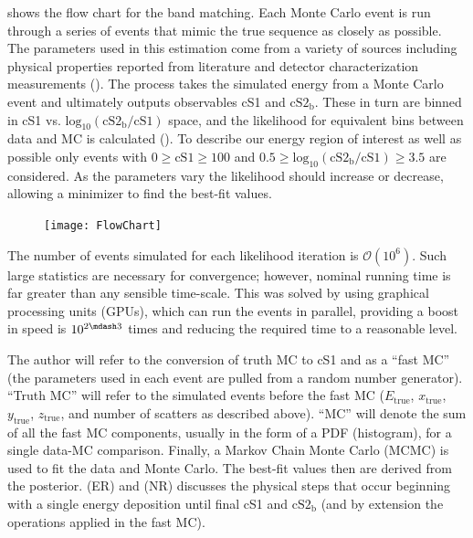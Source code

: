  shows the flow chart for the band matching.  Each Monte Carlo event is run
through a series of events that mimic the true sequence as closely as possible.  The parameters used in this estimation come from
a variety of sources including physical properties reported from literature and detector characterization measurements
().  The process takes the simulated energy from a Monte Carlo event and ultimately outputs observables cS1 and
$\mathrm{cS2_b}$.  These in turn are binned in cS1 vs. $\mathrm{log_{10}(cS2_b / cS1)}$ space, and the likelihood for equivalent bins
between data and MC is calculated ().  To describe our energy region of
interest as well as possible only events with $0 \geq \mathrm{cS1} \geq 100$ and $0.5 \geq \mathrm{log_{10}(cS2_b / cS1)} \geq 3.5$ are
considered.  As the parameters vary the likelihood should increase or decrease, allowing a minimizer to find the best-fit values.

\begin{figure}
\centering
\texttt{[image: FlowChart]}
\label{fig:er_nr_calibrations_parameter_determ_flow_chart}
\end{figure}

The number of events simulated for each likelihood iteration is $\mathcal{O}(10^6)$.  Such large statistics are necessary for convergence;
however, nominal running time is far greater than any sensible time-scale.  This was solved by using graphical processing units (GPUs),
which can run the events in parallel, providing a boost in speed is $10^{2 \mdash 3}$ times and reducing the required time to a
reasonable level.

The author will refer to the conversion of truth MC to cS1 and \cstwob as a ``fast MC'' (the parameters used in each event are pulled
from a random number generator).  ``Truth MC'' will refer to the simulated events before the fast MC ($E_{\mathrm{true}}$,
$x_{\mathrm{true}}$, $y_{\mathrm{true}}$, $z_{\mathrm{true}}$, and number
of scatters as described above).  ``MC'' will denote the sum of all the fast MC components, usually in the form of a PDF (histogram), for
a single data-MC comparison.  Finally, a Markov Chain Monte Carlo (MCMC) is used to fit the data and Monte Carlo.  The best-fit values
then are derived from the posterior.   (ER) and
 (NR) discusses the physical steps that occur beginning with a single energy
deposition until final cS1 and $\mathrm{cS2_b}$ (and by extension the operations applied in the fast MC).

